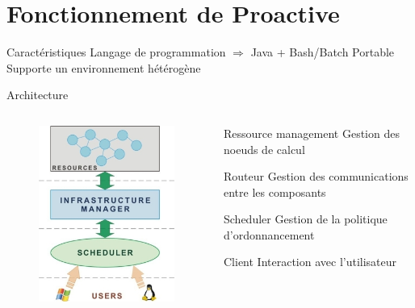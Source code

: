 \documentclass[handout]{beamer}
\begin{document}
\section[Fonctionnement]{Fonctionnement de Proactive}
\begin{frame}{Caractéristiques}
    Langage de programmation $\Longrightarrow$ Java + Bash/Batch
    Portable
    Supporte un environnement hétérogène%

\end{frame}
\begin{frame}{Architecture}
	\begin{columns}
	\begin{column}[l]{0.5\linewidth}
        \begin{figure}
            \centering
            \includegraphics[scale=0.4]{arch.png}
        \end{figure}
	\end{column}
	\begin{column}[r]{0.5\linewidth}
        \begin{alertblock}{Ressource management}
            Gestion des noeuds de calcul
        \end{alertblock}
        \begin{block}{Routeur}
             Gestion des communications entre les composants
        \end{block}
        \begin{exampleblock}{Scheduler}
             Gestion de la politique d'ordonnancement
        \end{exampleblock}
        \begin{alertblock}{Client}
            Interaction avec l'utilisateur
        \end{alertblock}
        
	\end{column}
	\end{columns}
\end{frame}
\end{document}
